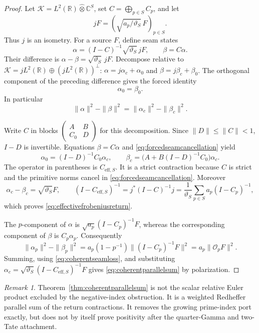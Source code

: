 \documentclass[11pt]{amsart}
\theoremstyle{definition}
\theoremstyle{remark}
\newtheorem{remark}[theorem]{Remark}
\begin{document}
\begin{proof}
Let
\(
 \mathcal K=L^2(\mathbb R)\widehat\otimes\mathbb C^S
\), set \(C=\bigoplus_{p\in S}C_p\), and let
\[
 jF=\left(\sqrt{a_p/\vartheta_S}\,F\right)_{p\in S}.
\]
Thus $j$ is an isometry.  For a source $F$, define seam states
\[
 \alpha=(I-C)^{-1}\sqrt{\vartheta_S}\,jF,
 \qquad \beta=C\alpha.
\]
Their difference is
\(
 \alpha-\beta=\sqrt{\vartheta_S}\,jF
\).
Decompose relative to
\(
 \mathcal K=jL^2(\mathbb R)\oplus(jL^2(\mathbb R))^\perp
\):
\(
 \alpha=j\alpha_c+\alpha_0
\) and
\(
 \beta=j\beta_c+\beta_0
\).
The orthogonal component of the preceding difference gives the forced
identity
\begin{equation}\label{eq:forcedseamcancellation}
 \alpha_0=\beta_0.
\end{equation}
In particular
\begin{equation}\label{eq:coherentseamloss}
 \|\alpha\|^2-\|\beta\|^2
 =\|\alpha_c\|^2-\|\beta_c\|^2.
\end{equation}

Write $C$ in blocks
\(
 \left(\begin{smallmatrix}A&B\\ C_0&D\end{smallmatrix}\right)
\)
for this decomposition.  Since $\|D\|\le\|C\|<1$,
$I-D$ is invertible.  Equations $\beta=C\alpha$ and
\eqref{eq:forcedseamcancellation} yield
\[
 \alpha_0=(I-D)^{-1}C_0\alpha_c,
 \qquad
 \beta_c=\bigl(A+B(I-D)^{-1}C_0\bigr)\alpha_c.
\]
The operator in parentheses is $C_{\mathrm{eff},S}$.  It is a strict
contraction because $C$ is strict and the primitive norms cancel in
\eqref{eq:forcedseamcancellation}.  Moreover
\[
 \alpha_c-\beta_c=\sqrt{\vartheta_S}F,
 \qquad
 (I-C_{\mathrm{eff},S})^{-1}
 =j^*(I-C)^{-1}j
 =\frac{1}{\vartheta_S}\sum_{p\in S}a_p(I-C_p)^{-1},
\]
which proves \eqref{eq:effectivefrobeniusreturn}.

The $p$-component of $\alpha$ is
\(
 \sqrt{a_p}(I-C_p)^{-1}F
\), whereas the corresponding component of $\beta$ is $C_p\alpha_p$.
Consequently
\[
 \|\alpha_p\|^2-\|\beta_p\|^2
 =a_p(1-p^{-1})\|(I-C_p)^{-1}F\|^2
 =a_p\|\mathcal O_pF\|^2.
\]
Summing, using \eqref{eq:coherentseamloss}, and substituting
\(
 \alpha_c=\sqrt{\vartheta_S}
 (I-C_{\mathrm{eff},S})^{-1}F
\)
gives \eqref{eq:coherentparallelsum} by polarization.
\end{proof}

\begin{remark}
Theorem~\ref{thm:coherentparallelsum} is not the scalar relative Euler
product excluded by the negative-index obstruction.  It is a weighted
Redheffer parallel sum of the return contractions.  It removes the growing
prime-index port exactly, but does not by itself prove positivity after the
quarter-Gamma and two-Tate attachment.
\end{remark}
\end{document}
